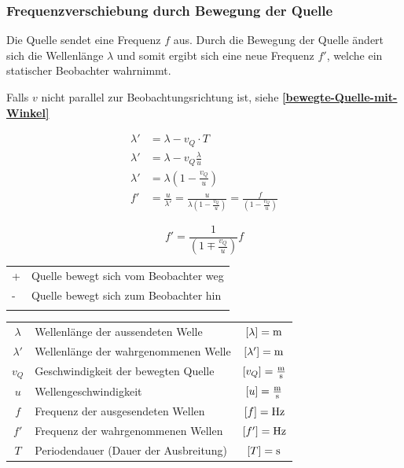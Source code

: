 \subsubsection{Frequenzverschiebung durch Bewegung der Quelle}

Die Quelle sendet eine Frequenz $f$ aus. Durch die Bewegung der Quelle ändert sich die Wellenlänge $\lambda$ und somit ergibt sich eine neue Frequenz $f'$, welche ein statischer Beobachter wahrnimmt. 

Falls $v$ nicht parallel zur Beobachtungsrichtung ist, siehe \textbf{\ref{bewegte-Quelle-mit-Winkel}}

\begin{align*}
\lambda' &= \lambda -v_Q \cdot T  \\
\lambda'&= \lambda -v_Q \frac{\lambda}{u}\\
\lambda' &= \lambda \left(1 - \frac{v_Q}{u}\right)  \\
f'&= \frac{u}{\lambda'} = \frac{u}{\lambda\left(1-\frac{v_Q}{u}\right)} = \frac{f}{\left(1-\frac{v_Q}{u}\right)}
\end{align*}


$$ \boxed{f' = \frac{1}{\left(1 \mp \frac{v_Q}{u}\right)}f}$$


\begin{tabular}{ll}
+ & Quelle bewegt sich vom Beobachter weg \\
- & Quelle bewegt sich zum Beobachter hin\\
\\
\end{tabular}


\begin{tabular}{clc}
$\lambda$ & Wellenlänge der aussendeten Welle & $[\lambda] = \mathrm{m}$ \\
$\lambda'$ & Wellenlänge der wahrgenommenen Welle & $[\lambda'] = \mathrm{m}$ \\
$v_Q$ & Geschwindigkeit der bewegten Quelle & $[v_Q] = \frac{\mathrm{m}}{\mathrm{s}}$ \\
$u$ & Wellengeschwindigkeit & $[u] = \frac{\mathrm{m}}{\mathrm{s}}$ \\
$f$ & Frequenz der ausgesendeten Wellen & $[f] = \mathrm{Hz}$ \\
$f'$ & Frequenz der wahrgenommenen Wellen & $[f'] = \mathrm{Hz}$ \\
$T$ & Periodendauer (Dauer der Ausbreitung) & $[T] = \mathrm{s}$ \\
\end{tabular}




